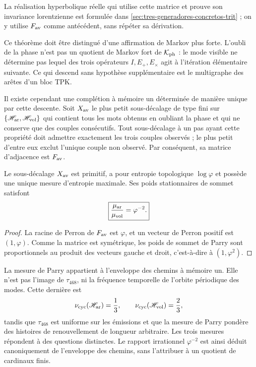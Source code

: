 La réalisation hyperbolique réelle qui utilise cette matrice et prouve son
invariance lorentzienne est formulée dans
\cref{sec:tres-generadores-concretos-trit} ; on y utilise \(F_{\rm av}\)
comme antécédent, sans répéter sa dérivation.

Ce théorème doit être distingué d'une affirmation de Markov plus forte.
L'oubli de la phase n'est pas un quotient de Markov fort de
\(\mathcal K_{\rm ph}\) : le mode visible ne détermine pas lequel des trois
opérateurs \(I,E_+,E_\times\) agit à l'itération élémentaire suivante. Ce qui descend
sans hypothèse supplémentaire est le multigraphe des arêtes d'un bloc TPK\@.

Il existe cependant une complétion à mémoire un déterminée de manière
unique par cette descente. Soit \(X_{\rm av}\) le plus petit sous-décalage de type fini
sur
\(\{\mathscr H_{\rm ar},\mathscr H_{\rm vol}\}\) qui contient tous les
mots obtenus en oubliant la phase et qui ne conserve que des couples consécutifs.
Tout sous-décalage à un pas ayant cette propriété doit admettre exactement les trois
couples observés ; le plus petit d'entre eux exclut l'unique couple non observé. Par
conséquent, sa matrice d'adjacence est \(F_{\rm av}\).

\begin{corollary}
\label{p12-83-c16-s2:cor:parry-envolvente-fav}
Le sous-décalage \(X_{\rm av}\) est primitif, a pour entropie topologique
\(\log\varphi\) et possède une unique mesure d'entropie maximale. Ses poids
stationnaires de sommet satisfont
\[
 \boxed{
 \frac{\mu_{\rm ar}}{\mu_{\rm vol}}=\varphi^{-2}.}
\]
\end{corollary}

\begin{proof}
La racine de Perron de \(F_{\rm av}\) est \(\varphi\), et un vecteur de Perron
positif est \((1,\varphi)\). Comme la matrice est symétrique, les poids de sommet
de Parry sont proportionnels au produit des vecteurs gauche et droit,
c'est-à-dire à \((1,\varphi^2)\).
\end{proof}

La mesure de Parry appartient à l'enveloppe des chemins à mémoire un. Elle n'est pas
l'image de \(\tau_{468}\), ni la fréquence temporelle de l'orbite périodique
des modes. Cette dernière est
\[
 \nu_{\rm cyc}(\mathscr H_{\rm ar})=\frac13,\qquad
 \nu_{\rm cyc}(\mathscr H_{\rm vol})=\frac23,
\]
tandis que \(\tau_{468}\) est uniforme sur les émissions et que la mesure de Parry
pondère des histoires de renouvellement de longueur arbitraire. Les trois mesures
répondent à des questions distinctes. Le rapport irrationnel
\(\varphi^{-2}\) est ainsi déduit canoniquement de l'enveloppe des chemins,
sans l'attribuer à un quotient de cardinaux finis.

